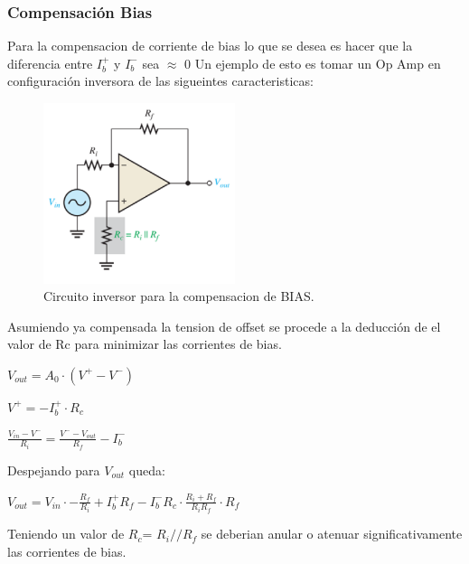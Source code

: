 \documentclass[a4paper]{article}
\begin{document}
\subsubsection{Compensación Bias}
Para la compensacion de corriente de bias lo que se desea es hacer que la diferencia entre $I_b^+$ y $I_b^-$ sea $\approx$ 0
Un ejemplo de esto es tomar un Op Amp en configuración inversora  de las sigueintes caracteristicas:
\begin{figure}[H]	
	\centering
	\includegraphics[width=0.5\textwidth]{imagenes/CompensacionBias.PNG}
	\caption{Circuito inversor para la compensacion de BIAS.}
	\label{fig:CompensacionBias}
\end{figure}
Asumiendo ya compensada la tension de offset se procede a la deducción de el valor de Rc para minimizar las corrientes de bias.
\begin{center}$V_{out}=A_0 \cdot (V^+ - V^-)$\\\end{center}
\begin{center}$V^+=-I_b^+ \cdot R_c$\\\end{center}
\begin{center}$\frac{V_{in}-V^-}{R_i}=\frac{V^- - V_{out}}{R_f} -I_b^-$\\\end{center}
Despejando para $V_{out}$ queda:
\begin{center}$V_{out}=V_{in}\cdot -\frac{R_f}{R_i}+I_b^+ R_f-I_b^- R_c \cdot \frac{R_i+R_f}{R_i R_f}\cdot R_f $\\\end{center}
Teniendo un valor de $R_c$= $R_i//R_f$ se deberian anular o atenuar significativamente las corrientes de bias.
\end{document}
